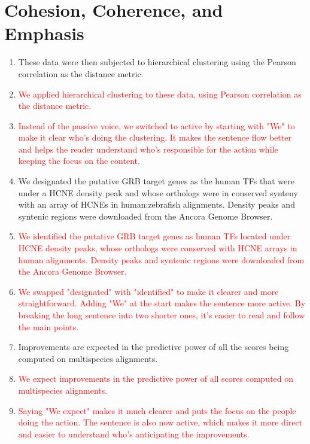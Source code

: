 \documentclass{article}
\newcommand{\red}[1]{\textcolor{red}{#1}}
\begin{document}
\section{Cohesion, Coherence, and Emphasis}

\begin{enumerate}
    \item These data were then subjected to hierarchical clustering using the Pearson correlation as the distance metric.
    \item[] \red{We applied hierarchical clustering to these data, using Pearson correlation as the distance metric.}
    \item[] \red{Instead of the passive voice, we switched to active by starting with "We" to make it clear who’s doing the clustering. It makes the sentence flow better and helps the reader understand who’s responsible for the action while keeping the focus on the content.}
    
    \item We designated the putative GRB target genes as the human TFs that were under a HCNE density peak and whose orthologs were in conserved synteny with an array of HCNEs in human:zebrafish alignments. Density peaks and syntenic regions were downloaded from the Ancora Genome Browser.
    \item[] \red{We identified the putative GRB target genes as human TFs located under HCNE density peaks, whose orthologs were conserved with HCNE arrays in human alignments. Density peaks and syntenic regions were downloaded from the Ancora Genome Browser.}
    \item[] \red{We swapped "designated" with "identified" to make it clearer and more straightforward. Adding "We" at the start makes the sentence more active. By breaking the long sentence into two shorter ones, it’s easier to read and follow the main points.}
    
    \item Improvements are expected in the predictive power of all the scores being computed on multispecies alignments.
    \item[] \red{We expect improvements in the predictive power of all scores computed on multispecies alignments.}
    \item[] \red{Saying "We expect" makes it much clearer and puts the focus on the people doing the action. The sentence is also now active, which makes it more direct and easier to understand who's anticipating the improvements.}


\end{enumerate}
\end{document}
